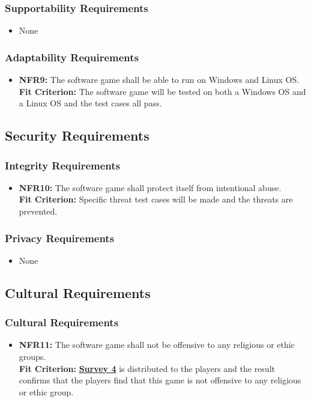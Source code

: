 \documentclass[12pt, titlepage]{article}
\begin{document}
\subsubsection{Supportability Requirements}
\begin{itemize}
        \item None
\end{itemize}
\subsubsection{Adaptability Requirements}
\begin{itemize}
        \item \textbf{NFR9:} The software game shall be able to run on Windows and Linux OS.\\
                    \textbf{Fit Criterion:} The software game will be tested on both a Windows OS and a Linux OS and the test cases all pass.
\end{itemize}
\subsection{Security Requirements}
\subsubsection{Integrity Requirements}
\begin{itemize}
        \item \textbf{NFR10:} The software game shall protect itself from intentional abuse.\\
                    \textbf{Fit Criterion:} Specific threat test cases will be made and the threats are prevented.
\end{itemize}
\subsubsection{Privacy Requirements}
\begin{itemize}
        \item None
\end{itemize}
\subsection{Cultural Requirements}
\subsubsection{Cultural Requirements}
\begin{itemize}
        \item \textbf{NFR11:} The software game shall not be offensive to any religious or ethic groups.\\
        \textbf{Fit Criterion:} \hyperref[s1]{\textbf{Survey 4}} is distributed to the players and the result confirms that the players find that this game is not offensive to any religious or ethic group.
\end{itemize}
\end{document}
